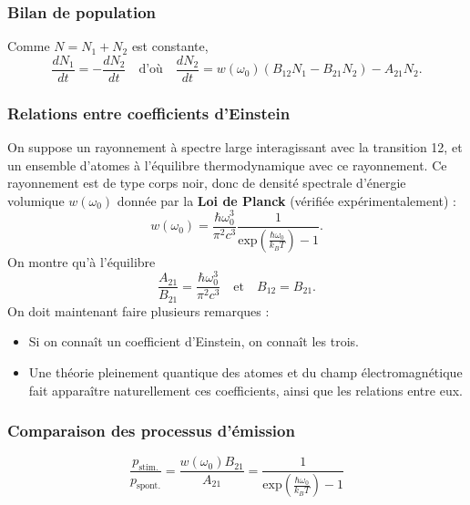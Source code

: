 \documentclass[11pt,a4paper]{report}
\begin{document}
\subsubsection{Bilan de population}
Comme $N = N_1 + N_2$ est constante,
\begin{equation}
	\frac{dN_1}{dt} = - \frac{dN_2}{dt} \quad\text{d'où}\quad
	\boxed{\frac{dN_2}{dt} = w(\omega_0)\left(B_{12} N_1 - B_{21}N_2\right) - A_{21}N_2}.
\end{equation}

\subsubsection{Relations entre coefficients d'Einstein}
On suppose un rayonnement à spectre large interagissant avec la transition 12, et un ensemble d'atomes à l'équilibre thermodynamique avec ce rayonnement. Ce rayonnement est de type corps noir, donc de densité spectrale d'énergie volumique $w(\omega_0)$ donnée par la \textbf{Loi de Planck} (vérifiée expérimentalement) :
\begin{equation}
	w(\omega_0) = \frac{\hbar \omega_0^3}{\pi^2 c^3}
	\frac{1}{\displaystyle{\text{exp}\left(\frac{\hbar \omega_0}{k_B T}\right)-1}}.
\end{equation}
On montre qu'à l'équilibre
\begin{equation}
	\boxed{\frac{A_{21}}{B_{21}} = \frac{\hbar\omega_0^3}{\pi^2 c^3}} 
	\quad\text{et}\quad \boxed{B_{12} = B_{21}}.
\end{equation}
On doit maintenant faire plusieurs remarques :
\begin{itemize}
	\item Si on connaît un coefficient d'Einstein, on connaît les trois.
	\item Une théorie pleinement quantique des atomes et du champ électromagnétique fait apparaître 			naturellement ces coefficients, ainsi que les relations entre eux.
\end{itemize}

\subsubsection{Comparaison des processus d'émission}
\begin{equation}
	\frac{p_\text{stim.}}{p_\text{spont.}} = \frac{w(\omega_0)B_{21}}{A_{21}} 
	= \frac{1}{\displaystyle{\text{exp}\left(\frac{\hbar\omega_0}{k_B T}\right)-1}}
\end{equation}
\end{document}
